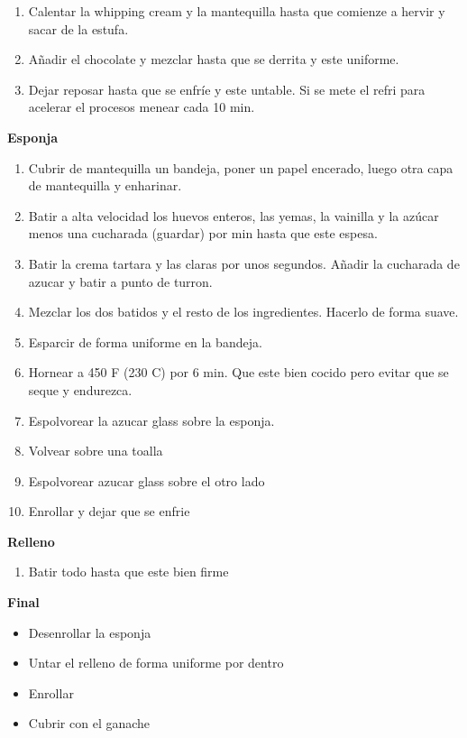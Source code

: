 \begin{enumerate}
\item Calentar la whipping cream y la mantequilla hasta que comienze a hervir y sacar de la estufa.
\item Añadir el chocolate y mezclar hasta que se derrita y este uniforme.
\item Dejar reposar hasta que se enfríe y este untable. Si se mete el refri para acelerar el procesos menear cada 10 min.
\end{enumerate}

\textbf{Esponja}

\begin{enumerate}
\item Cubrir de mantequilla un bandeja, poner un papel encerado, luego otra capa de mantequilla y enharinar.
\item Batir a alta velocidad los huevos enteros, las yemas, la vainilla y la azúcar menos una cucharada (guardar) por  min hasta que este espesa.
\item Batir la crema tartara y las claras por unos segundos. Añadir la cucharada de azucar y batir a punto de turron.
\item Mezclar los dos batidos y el resto de los ingredientes. Hacerlo de forma suave.
\item Esparcir de forma uniforme en la bandeja.
\item Hornear a 450 F (230 C) por 6 min. Que este bien cocido pero evitar que se seque y endurezca.
\item Espolvorear la azucar glass sobre la esponja.
\item Volvear sobre una toalla
\item Espolvorear azucar glass sobre el otro lado
\item Enrollar y dejar que se enfrie
\end{enumerate}

\textbf{Relleno}
\begin{enumerate}
\item Batir todo hasta que este bien firme
\end{enumerate}

\textbf{Final}
\begin{itemize}
\item Desenrollar la esponja
\item Untar el relleno de forma uniforme por dentro
\item Enrollar
\item Cubrir con el ganache
\end{itemize}

